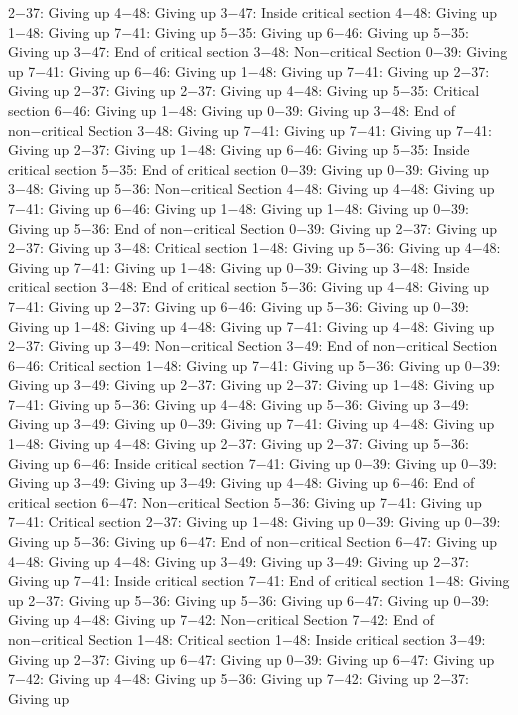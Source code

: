 2−37: Giving up
4−48: Giving up
3−47: Inside critical section
4−48: Giving up
1−48: Giving up
7−41: Giving up
5−35: Giving up
6−46: Giving up
5−35: Giving up
3−47: End of critical section
3−48: Non−critical Section
0−39: Giving up
7−41: Giving up
6−46: Giving up
1−48: Giving up
7−41: Giving up
2−37: Giving up
2−37: Giving up
2−37: Giving up
4−48: Giving up
5−35: Critical section
6−46: Giving up
1−48: Giving up
0−39: Giving up
3−48: End of non−critical Section
3−48: Giving up
7−41: Giving up
7−41: Giving up
7−41: Giving up
2−37: Giving up
1−48: Giving up
6−46: Giving up
5−35: Inside critical section
5−35: End of critical section
0−39: Giving up
0−39: Giving up
3−48: Giving up
5−36: Non−critical Section
4−48: Giving up
4−48: Giving up
7−41: Giving up
6−46: Giving up
1−48: Giving up
1−48: Giving up
0−39: Giving up
5−36: End of non−critical Section
0−39: Giving up
2−37: Giving up
2−37: Giving up
3−48: Critical section
1−48: Giving up
5−36: Giving up
4−48: Giving up
7−41: Giving up
1−48: Giving up
0−39: Giving up
3−48: Inside critical section
3−48: End of critical section
5−36: Giving up
4−48: Giving up
7−41: Giving up
2−37: Giving up
6−46: Giving up
5−36: Giving up
0−39: Giving up
1−48: Giving up
4−48: Giving up
7−41: Giving up
4−48: Giving up
2−37: Giving up
3−49: Non−critical Section
3−49: End of non−critical Section
6−46: Critical section
1−48: Giving up
7−41: Giving up
5−36: Giving up
0−39: Giving up
3−49: Giving up
2−37: Giving up
2−37: Giving up
1−48: Giving up
7−41: Giving up
5−36: Giving up
4−48: Giving up
5−36: Giving up
3−49: Giving up
3−49: Giving up
0−39: Giving up
7−41: Giving up
4−48: Giving up
1−48: Giving up
4−48: Giving up
2−37: Giving up
2−37: Giving up
5−36: Giving up
6−46: Inside critical section
7−41: Giving up
0−39: Giving up
0−39: Giving up
3−49: Giving up
3−49: Giving up
4−48: Giving up
6−46: End of critical section
6−47: Non−critical Section
5−36: Giving up
7−41: Giving up
7−41: Critical section
2−37: Giving up
1−48: Giving up
0−39: Giving up
0−39: Giving up
5−36: Giving up
6−47: End of non−critical Section
6−47: Giving up
4−48: Giving up
4−48: Giving up
3−49: Giving up
3−49: Giving up
2−37: Giving up
7−41: Inside critical section
7−41: End of critical section
1−48: Giving up
2−37: Giving up
5−36: Giving up
5−36: Giving up
6−47: Giving up
0−39: Giving up
4−48: Giving up
7−42: Non−critical Section
7−42: End of non−critical Section
1−48: Critical section
1−48: Inside critical section
3−49: Giving up
2−37: Giving up
6−47: Giving up
0−39: Giving up
6−47: Giving up
7−42: Giving up
4−48: Giving up
5−36: Giving up
7−42: Giving up
2−37: Giving up
